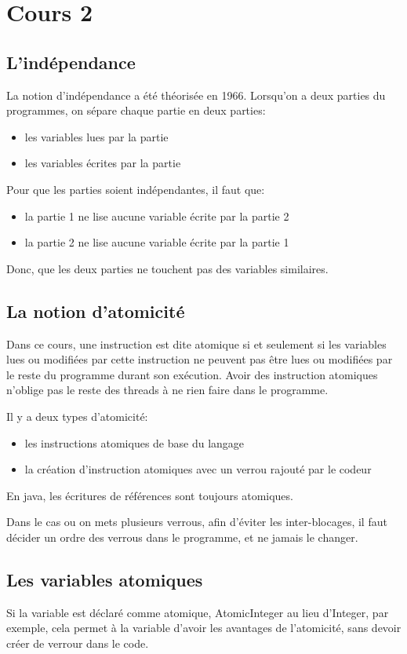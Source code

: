\section{Cours 2}
\subsection{L'indépendance}
La notion d'indépendance a été théorisée en 1966.
Lorsqu'on a deux parties du programmes, on sépare chaque partie en deux parties:
\begin{itemize}
	\item les variables lues par la partie
	\item les variables écrites par la partie
\end{itemize}
Pour que les parties soient indépendantes, il faut que:
\begin{itemize}
	\item la partie 1 ne lise aucune variable écrite par la partie 2
	\item la partie 2 ne lise aucune variable écrite par la partie 1
\end{itemize}
Donc, que les deux parties ne touchent pas des variables similaires.

\subsection{La notion d'atomicité}
Dans ce cours, une instruction est dite atomique si et seulement si les variables lues ou modifiées par cette
instruction ne peuvent pas être lues ou modifiées par le reste du programme durant son exécution.
Avoir des instruction atomiques n'oblige pas le reste des threads à ne rien faire dans le programme.

Il y a deux types d'atomicité:
\begin{itemize}
	\item les instructions atomiques de base du langage
	\item la création d'instruction atomiques avec un verrou rajouté par le codeur
\end{itemize}
En java, les écritures de références sont toujours atomiques.

Dans le cas ou on mets plusieurs verrous, afin d'éviter les inter-blocages, il faut décider un ordre des verrous
dans le programme, et ne jamais le changer.

\subsection{Les variables atomiques}
Si la variable est déclaré comme atomique, AtomicInteger au lieu d'Integer, par exemple, cela permet à la variable
d'avoir les avantages de l'atomicité, sans devoir créer de verrour dans le code.
